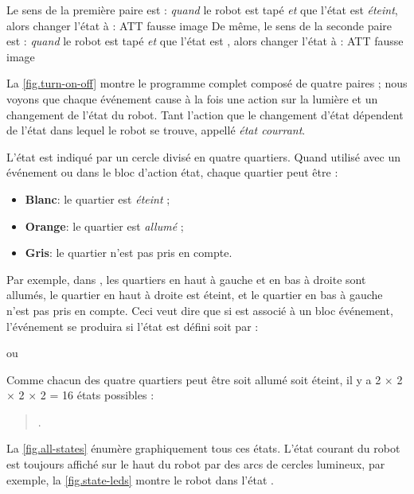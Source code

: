 Le sens de la première paire est : \emph{quand} le robot est tapé \emph{et} que l'état est \emph{éteint}, alors changer l'état à  : ATT fausse image 
De même, le sens de la seconde paire est : \emph{quand} le robot est tapé \emph{et} que l'état est , alors changer l'état à  : ATT fausse image 

La \cref{fig.turn-on-off} montre le programme complet composé de quatre paires ; nous voyons que chaque événement cause à la fois une action sur la lumière et un changement de l'état du robot.
Tant l'action que le changement d'état dépendent de l'état dans lequel le robot se trouve, appellé \emph{état courrant}.



L'état est indiqué par un cercle divisé en quatre quartiers.
Quand utilisé avec un événement ou dans le bloc d'action état, chaque quartier peut être :
\begin{itemize}
	\item \textbf{Blanc}: le quartier est \emph{éteint} ;
	\item \textbf{Orange}: le quartier est \emph{allumé} ;
	\item \textbf{Gris}: le quartier n'est pas pris en compte.
\end{itemize}

Par exemple, dans , les quartiers en haut à gauche et en bas à droite sont allumés, le quartier en haut à droite est éteint, et le quartier en bas à gauche n'est pas pris en compte.
Ceci veut dire que si  est associé à un bloc événement, l'événement se produira si l'état est défini soit par :
\begin{center}
\centering {}\quad ou \quad {}
\end{center}

Comme chacun des quatre quartiers peut être soit allumé soit éteint, il y a 2 $\times$ 2 $\times$ 2 $\times$ 2 = 16 états possibles :
\begin{quote}
.
\end{quote}
La \cref{fig.all-states} énumère graphiquement tous ces états.
L'état courant du robot est toujours affiché sur le haut du robot par des arcs de cercles lumineux, par exemple, la \cref{fig.state-leds} montre le robot dans l'état .

